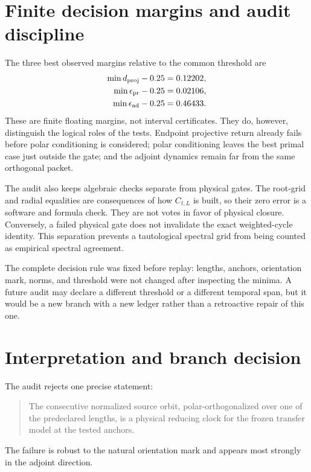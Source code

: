 \documentclass[12pt]{article}
\theoremstyle{remark}
\begin{document}
\section{Finite decision margins and audit discipline}

The three best observed margins relative to the common threshold are
\begin{align}
 \min d_{\rm proj}-0.25&=0.12202,\label{eq:wrap-margin}\\
 \min\epsilon_{\rm pr}-0.25&=0.02106,\label{eq:primal-margin}\\
 \min\epsilon_{\rm ad}-0.25&=0.46433.\label{eq:adjoint-margin}
\end{align}
These are finite floating margins, not interval certificates.  They do,
however, distinguish the logical roles of the tests.  Endpoint projective
return already fails before polar conditioning is considered; polar
conditioning leaves the best primal case just outside the gate; and the
adjoint dynamics remain far from the same orthogonal packet.

The audit also keeps algebraic checks separate from physical gates.  The
root-grid and radial equalities are consequences of how $C_{t,L}$ is built,
so their zero error is a software and formula check.  They are not votes in
favor of physical closure.  Conversely, a failed physical gate does not
invalidate the exact weighted-cycle identity.  This separation prevents a
tautological spectral grid from being counted as empirical spectral
agreement.

The complete decision rule was fixed before replay: lengths, anchors,
orientation mark, norms, and threshold were not changed after inspecting
the minima.  A future audit may declare a different threshold or a different
temporal span, but it would be a new branch with a new ledger rather than a
retroactive repair of this one.

\section{Interpretation and branch decision}

The audit rejects one precise statement:
\begin{quote}
The consecutive normalized source orbit, polar-orthogonalized over one of
the predeclared lengths, is a physical reducing clock for the frozen
transfer model at the tested anchors.
\end{quote}
The failure is robust to the natural orientation mark and appears most
strongly in the adjoint direction.
\end{document}
